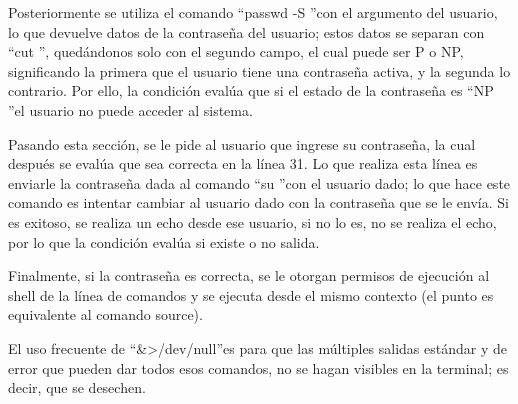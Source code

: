 \documentclass[letter,12pt]{article} %
\begin{document}
Posteriormente se utiliza el comando \textquotedblleft passwd -S \textquotedblright con el argumento del usuario, lo que devuelve datos de la contraseña del usuario; estos datos se separan con \textquotedblleft cut \textquotedblright, quedándonos solo con el segundo campo, el cual puede ser P o NP, significando la primera que el usuario tiene una contraseña activa, y la segunda lo contrario. Por ello, la condición evalúa que si el estado de la contraseña es \textquotedblleft NP \textquotedblright el usuario no puede acceder al sistema.\\
\vspace{\baselineskip}

Pasando esta sección, se le pide al usuario que ingrese su contraseña, la cual después se evalúa que sea correcta en la línea 31. Lo que realiza esta línea es enviarle la contraseña dada al comando \textquotedblleft su \textquotedblright con el usuario dado; lo que hace este comando es intentar cambiar al usuario dado con la contraseña que se le envía. Si es exitoso, se realiza un echo desde ese usuario, si no lo es, no se realiza el echo, por lo que la condición evalúa si existe o no salida.\\
\vspace{\baselineskip}

Finalmente, si la contraseña es correcta, se le otorgan permisos de ejecución al shell de la línea de comandos y se ejecuta desde el mismo contexto (el punto es equivalente al comando source).\\
\vspace{\baselineskip}

El uso frecuente de \textquotedblleft \&\textgreater/dev/null\textquotedblright es para que las múltiples salidas estándar y de error que pueden dar todos esos comandos, no se hagan visibles en la terminal; es decir, que se desechen.\\
\vspace{\baselineskip}
\end{document}
